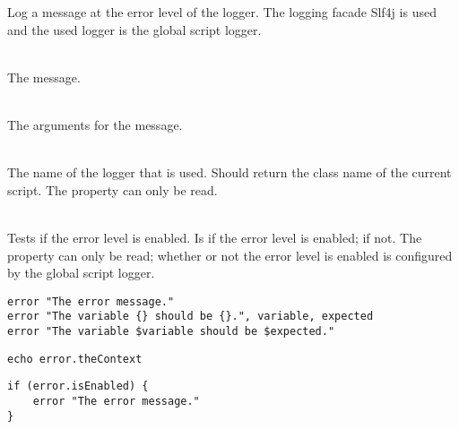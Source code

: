 %


Log a message at the error level of the logger.
The logging facade Slf4j\cite{slf4j13} is used and the used logger is
the global script logger.

\begin{asparadesc}
%
\item[\code{message}] \hfill \\
The message.
%
\item[\code{arguments...}] \hfill \\
The arguments for the message.
%
\item[\code{theContext}] \hfill \\
The name of the logger that is used. Should return the class name of the current
script. The property can only be read.
%
\item[\code{isEnabled}] \hfill \\
Tests if the error level is enabled. Is  if the error level is enabled;
 if not. The property can only be read; whether or not the error
level is enabled is configured by the global script logger.
%
\end{asparadesc}

\begin{lstlisting}[style=Groovybash, label={lst:example_error1}, title={%
Outputs a error logging message with arguments.}]
error "The error message."
error "The variable {} should be {}.", variable, expected
error "The variable $variable should be $expected."
\end{lstlisting}

\begin{lstlisting}[style=Groovybash, label={lst:example_error2}, title={%
Prints the name of the current logger.}]
echo error.theContext
\end{lstlisting}

\begin{lstlisting}[style=Groovybash, label={lst:example_error3}, title={%
Tests if the error level is enabled.}]
if (error.isEnabled) {
    error "The error message."
}
\end{lstlisting}

